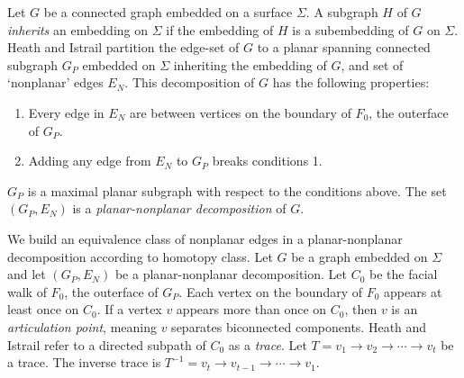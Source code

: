 Let $G$ be a connected graph embedded on a surface $\Sigma$. A subgraph $H$ of $G$ \textit{inherits} an embedding on $\Sigma$ if the embedding of $H$ is a subembedding of $G$ on $\Sigma$. Heath and Istrail partition the edge-set of \(G\) to a planar spanning connected subgraph \(G_P\) embedded on $\Sigma$ inheriting the embedding of $G$, and set of `nonplanar' edges $E_N$. This decomposition of $G$ has the following properties:
\begin{enumerate}
	\item Every edge in \(E_N\) are between vertices on the boundary of $F_0$, the outerface of $G_P$.
	\item Adding any edge from $E_N$ to \(G_P\) breaks conditions 1.
\end{enumerate}
$G_P$ is a maximal planar subgraph with respect to the conditions above. The set $(G_P, E_N)$ is a \textit{planar-nonplanar decomposition} of $G$. 


We build an equivalence class of nonplanar edges in a planar-nonplanar decomposition according to homotopy class. Let $G$ be a graph embedded on $\Sigma$ and let $(G_P, E_N)$ be a planar-nonplanar decomposition. Let \(C_0\) be the facial walk of \(F_0\), the outerface of $G_P$. Each vertex on the boundary of \(F_0\) appears at least once on $C_0$. If a vertex $v$ appears more than once on $C_0$, then $v$ is an \textit{articulation point}, meaning $v$ separates biconnected components. Heath and Istrail refer to a directed subpath of \(C_0\) as a \textit{trace}. Let \(T = v_1 \rightarrow v_2 \rightarrow \cdots \rightarrow v_t\) be a trace. The inverse trace is \(T^{-1} = v_t \rightarrow v_{t-1} \rightarrow \cdots \rightarrow v_1\).

